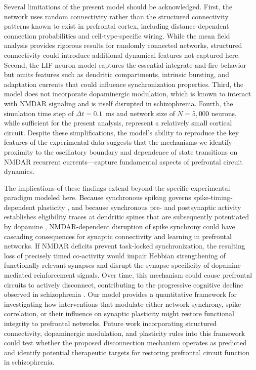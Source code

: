\documentclass[10pt]{article}
\begin{document}
Several limitations of the present model should be acknowledged. First, the network uses random connectivity rather than the structured connectivity patterns known to exist in prefrontal cortex, including distance-dependent connection probabilities and cell-type-specific wiring. While the mean field analysis provides rigorous results for randomly connected networks, structured connectivity could introduce additional dynamical features not captured here. Second, the LIF neuron model captures the essential integrate-and-fire behavior but omits features such as dendritic compartments, intrinsic bursting, and adaptation currents that could influence synchronization properties. Third, the model does not incorporate dopaminergic modulation, which is known to interact with NMDAR signaling and is itself disrupted in schizophrenia. Fourth, the simulation time step of $\Delta t = 0.1$~ms and network size of $N = 5{,}000$ neurons, while sufficient for the present analysis, represent a relatively small cortical circuit. Despite these simplifications, the model's ability to reproduce the key features of the experimental data suggests that the mechanisms we identify---proximity to the oscillatory boundary and dependence of state transitions on NMDAR recurrent currents---capture fundamental aspects of prefrontal circuit dynamics.

The implications of these findings extend beyond the specific experimental paradigm modeled here. Because synchronous spiking governs spike-timing-dependent plasticity \citep{dan2004spike}, and because synchronous pre- and postsynaptic activity establishes eligibility traces at dendritic spines that are subsequently potentiated by dopamine \citep{he2015eligibility, yagishita2014critical}, NMDAR-dependent disruption of spike synchrony could have cascading consequences for synaptic connectivity and learning in prefrontal networks. If NMDAR deficits prevent task-locked synchronization, the resulting loss of precisely timed co-activity would impair Hebbian strengthening of functionally relevant synapses and disrupt the synapse specificity of dopamine-mediated reinforcement signals. Over time, this mechanism could cause prefrontal circuits to actively disconnect, contributing to the progressive cognitive decline observed in schizophrenia \citep{zick2018blocking, zick2021disparate}. Our model provides a quantitative framework for investigating how interventions that modulate either network synchrony, spike correlation, or their influence on synaptic plasticity might restore functional integrity to prefrontal networks. Future work incorporating structured connectivity, dopaminergic modulation, and plasticity rules into this framework could test whether the proposed disconnection mechanism operates as predicted and identify potential therapeutic targets for restoring prefrontal circuit function in schizophrenia.
\end{document}
